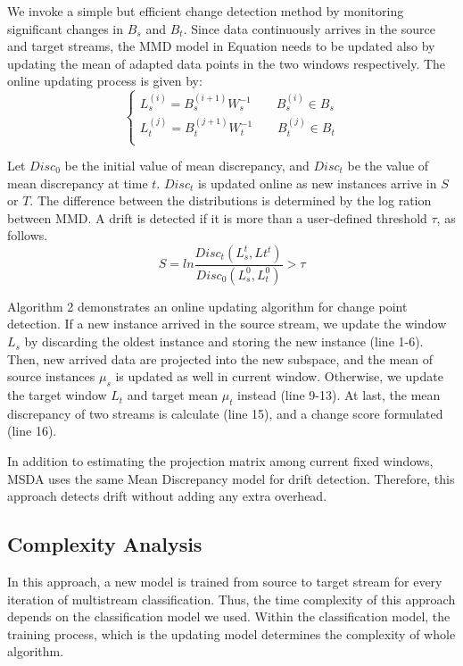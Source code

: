 We invoke a simple but efficient change detection method by monitoring significant changes in $B_s$ and $B_t$. Since data continuously arrives in the source and target streams, the MMD model in Equation needs to be updated also by updating the mean of adapted data points in the two windows respectively. The online updating process is given by:
\begin{equation}
\begin{cases}
L_s^{(i)}=B_s^{(i+1)}W_s^{-1} \qquad B_s^{(i)}\in B_s \\
L_t^{(j)}=B_t^{(j+1)}W_t^{-1} \qquad {B}_t^{(j)}\in {B}_t\\
\end{cases}
\end{equation}

Let $Disc_0$ be the initial value of mean discrepancy, and $Disc_t$ be the value of mean discrepancy at time $t$. $Disc_t$ is updated online as new instances arrive in $S$ or $T$. The difference between the distributions is determined by the log ration between MMD.
A drift is detected if it is more than a user-defined threshold $\tau$, as follows.
\begin{equation}
S = ln\frac{Disc_t(L_{s}^t,L{t}^t)}{Disc_0(L_{s}^0,L_{t}^0)}>\tau
\end{equation}

Algorithm 2 demonstrates an online updating algorithm for change point detection. If a new instance arrived in the source stream, we update the window $L_s$ by discarding the oldest instance and storing the new instance (line 1-6). Then, new arrived data are projected into the new subspace, and the mean of source instances $\mu_s$ is updated as well in current window. Otherwise, we update the target window $L_t$ and target mean $\mu_t$ instead (line 9-13). At last, the mean discrepancy of two streams is calculate (line 15), and a change score formulated (line 16).

In addition to estimating the projection matrix among current fixed windows, MSDA uses the same Mean Discrepancy model for drift detection. Therefore, this approach detects drift without adding any extra overhead.


\subsection{Complexity Analysis}
In this approach, a new model is trained from source to target stream for every iteration of multistream classification. Thus, the time complexity of this approach depends on the classification model we used. Within the classification model, the training process, which is the updating model determines the complexity of whole algorithm.

